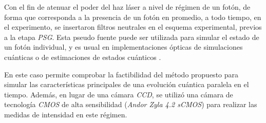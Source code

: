 
\bigskip

Con el fin de atenuar el poder del haz láser a nivel de régimen de un fotón, de forma que corresponda a la presencia  de un fotón en promedio, a todo tiempo, en el experimento, se  insertaron filtros neutrales
en el esquema experimental, previos a la etapa {\it PSG}. Esta pseudo fuente puede ser utilizada para simular el  estado de un fotón individual, y es usual en implementaciones ópticas de simulaciones cuánticas o de estimaciones de estados cuánticos \cite{Malik2014,QPS17}.

 En este caso permite  comprobar  la factibilidad del método propuesto para simular las características principales de una evolución cuántica paralela en el tiempo. 
Además, en lugar de una cámara {\it CCD}, se utilizó una cámara de tecnología {\it CMOS} de alta sensibilidad ({\it Andor Zyla 4.2 sCMOS}) para realizar las medidas de intensidad en este régimen. 










